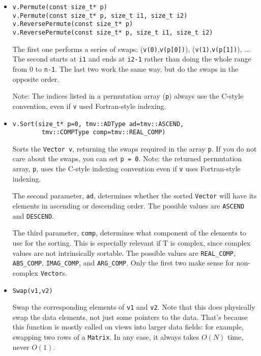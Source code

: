 \documentclass[twoside,letterpaper,11pt]{article}
\renewcommand{\tt}[1]{{\texttt {#1}}}
\begin{document}
\begin{itemize}
\item
\begin{verbatim}
v.Permute(const size_t* p)
v.Permute(const size_t* p, size_t i1, size_t i2)
v.ReversePermute(const size_t* p)
v.ReversePermute(const size_t* p, size_t i1, size_t i2)
\end{verbatim}
The first one performs a series of swaps: (\tt{v(0)},\tt{v(p[0])}), (\tt{v(1)},\tt{v(p[1])}), ... 
The second starts at \tt{i1} and ends at \tt{i2-1} rather than
doing the whole range from 0 to \tt{n-1}.
The last two work the same way, but do the swaps in the opposite order.

Note: The indices listed in a permutation array (\tt{p}) always use 
the C-style convention, even if \tt{v} used Fortran-style indexing.

\item
\begin{verbatim}
v.Sort(size_t* p=0, tmv::ADType ad=tmv::ASCEND, 
        tmv::COMPType comp=tmv::REAL_COMP)
\end{verbatim}
Sorts the \tt{Vector~v}, returning the swaps required in the array \tt{p}.
If you do not care about the swaps, you can set \tt{p = 0}.
Note: the returned permutation array, \tt{p}, uses the C-style indexing convention
even if \tt{v} uses Fortran-style indexing.

The second parameter, \tt{ad}, determines whether the sorted \tt{Vector} 
will have its elements in ascending or descending order.  The possible values
are \tt{ASCEND} and \tt{DESCEND}. 

The third parameter, \tt{comp}, determines what component of the
elements to use for the sorting.  This is especially relevant if T is complex, 
since complex values are not intrinsically sortable.
The possible values are
\tt{REAL\_COMP}, \tt{ABS\_COMP},
\tt{IMAG\_COMP}, and \tt{ARG\_COMP}.
Only the first two make sense for non-complex \tt{Vector}s.  

\item
\begin{verbatim}
Swap(v1,v2)
\end{verbatim}
Swap the corresponding elements of \tt{v1} and \tt{v2}.  Note that this does physically
swap the data elements, not just some pointers to the data.  That's because this function
is mostly called on views into larger data fields: for example, swapping two rows of a 
\tt{Matrix}.  In any case, it always takes $O(N)$ time, never $O(1)$.

\end{itemize}
\end{document}
